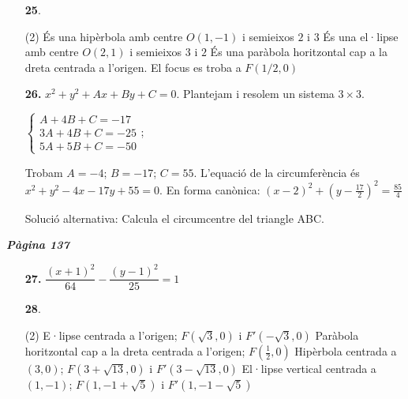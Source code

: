 \documentclass[a4paper, pdf, twoside]{book}
\begin{document}
\begin{multicols}{2}
\begin{enumerate}

 \item[\fontfamily{phv}\selectfont\color{blue}\textbf{25}. ] 
 \begin{tasks}[column-sep=1em, item-indent=1.3333em](2)
	 \task* És una hipèrbola amb centre $O(1,-1)$ i semieixos $2$ i $3$
	 \task* És una el·lipse amb centre $O(2,1)$ i semieixos $3$ i $2$
	 \task* És una paràbola horitzontal cap a la dreta centrada a l'origen. El focus es troba a $F(1/2,0)$
\end{tasks}
\vspace{0.25cm}
\item[\fontfamily{phv}\selectfont\color{blue}\textbf{26. }] 
$x^2+y^2+Ax+By+C=0$. Plantejam i resolem un sistema $3\times 3$.\par $\left \{ \begin {array}{l} A+4B+C=-17\\ 3A+4B+C=-25\\ 5A+5B+C=-50 \end {array} \right .$;\par Trobam $A=-4$; $B=-17$; $C=55$. L'equació de la circumferència és $x^2+y^2-4x-17y+55=0$. En forma canònica: $(x-2)^2+(y-\frac {17}{2})^2=\frac {85}{4}$ \par Solució alternativa: Calcula el circumcentre del triangle ABC.
 \end{enumerate}
\vspace{0.3cm}


{\textbf{\em Pàgina 137}} \hrulefill
\begin{enumerate}
\vspace{0.25cm}
\item[\fontfamily{phv}\selectfont\color{blue}\textbf{27. }] 
$\dfrac {(x+1)^2}{64}-\dfrac {(y-1)^2}{25}=1$
 \end{enumerate}
\begin{enumerate}
\vspace{0.25cm}



 \item[\fontfamily{phv}\selectfont\color{blue}\textbf{28}. ] 
 \begin{tasks}[column-sep=1em, item-indent=1.3333em](2)
	 \task* E·lipse centrada a l'origen; $F(\sqrt {3},0)$ i $F'(-\sqrt {3},0)$
	 \task* Paràbola horitzontal cap a la dreta centrada a l'origen; $F(\frac {1}{2},0)$
	 \task* Hipèrbola centrada a $(3,0)$; $F(3+\sqrt {13},0)$ i $F'(3-\sqrt {13},0)$
	 \task* El·lipse vertical centrada a $(1,-1)$; $F(1,-1+\sqrt {5})$ i $F'(1,-1-\sqrt {5})$
\end{tasks}
\vspace{0.25cm}



\end{enumerate}
\end{multicols}
\end{document}
